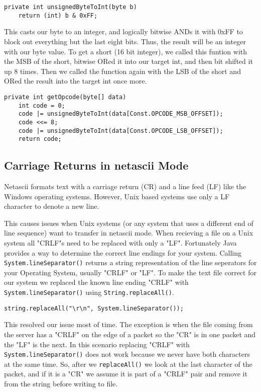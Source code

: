 \documentclass[12pt]{article}
\begin{document}
	\singlespacing
	\begin{lstlisting}
private int unsignedByteToInt(byte b)
	return (int) b & 0xFF;
	\end{lstlisting}
	\doublespacing
	
	This casts our byte to an integer, and logically bitwise ANDs it with 0xFF to block out everything but the last eight bits. Thus, the result will be an integer with our byte value. To get a short (16 bit integer), we called this funtion with the MSB of the short, bitwise ORed it into our target int, and then bit shifted it up 8 times. Then we called the function again with the LSB of the short and ORed the result into the target int once more.
	
	\singlespacing
	\begin{lstlisting}
private int getOpcode(byte[] data)
	int code = 0;
	code |= unsignedByteToInt(data[Const.OPCODE_MSB_OFFSET]);
	code <<= 8;
	code |= unsignedByteToInt(data[Const.OPCODE_LSB_OFFSET]);
	return code;
	\end{lstlisting}
	\doublespacing
	
	
	\subsection{Carriage Returns in netascii Mode}
	
	Netascii formats text with a carriage return (CR) and a line feed (LF) like the Windows operating systems. However, Unix based systems use only a LF character to denote a new line. 
	
	This causes issues when Unix systems (or any system that uses a different end of line sequence) want to transfer in netascii mode. When recieving a file on a Unix system all "CRLF"s need to be replaced with only a "LF". Fortunately Java provides a way to determine the correct line endings for your system. Calling \lstinline|System.lineSeparator()| returns a string representation of the line seperators for your Operating System, usually "CRLF" or "LF". To make the text file correct for our system we replaced the known line ending "CRLF" with \lstinline|System.lineSeparator()| using \lstinline|String.replaceAll()|.
	
\begin{lstlisting}
string.replaceAll("\r\n", System.lineSeparator());
\end{lstlisting}

	This resolved our issue most of time. The exception is when the file coming from the server has a "CRLF" on the edge of a packet so the "CR" is in one packet and the "LF" is the next. In this scenario replacing "CRLF" with \lstinline|System.lineSeparator()| does not work because we never have both characters at the same time. So, after we \lstinline|replaceAll()| we look at the last character of the packet, and if it is a "CR" we assume it is part of a "CRLF" pair and remove it from the string before writing to file.
	
\end{document}

